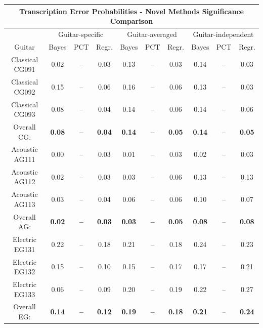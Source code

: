 \documentclass[12pt]{cmuthesis}
\begin{document}
\begin{table}[!htbp]
\begin{center}
\begin{tabular} {||c||c|c|c||c|c|c||c|c|c||}
\hline
\multicolumn{10}{||c||}{\bf{Transcription Error Probabilities - Novel Methods Significance Comparison}} \\
\hline
 & \multicolumn{3}{|c||}{Guitar-specific} & \multicolumn{3}{|c||}{Guitar-averaged}& \multicolumn{3}{|c||}{Guitar-independent}\\
\hline
Guitar & Bayes & PCT & Regr. & Bayes & PCT & Regr. & Bayes & PCT & Regr.\\
\hline
\hline
Classical CG091 & 0.02 & -- & 0.03 & 0.13 & -- & \cellcolor[gray]{0.8}0.03 & 0.14 & -- & \cellcolor[gray]{0.8}0.03 \\
\hline
Classical CG092 & 0.15 & -- & \cellcolor[gray]{0.8}0.06 & 0.16 & -- & \cellcolor[gray]{0.8}0.06 & 0.13 & -- & \cellcolor[gray]{0.8}0.03 \\
\hline
Classical CG093 & 0.08 & -- & \cellcolor[gray]{0.8}0.04 & 0.14 & -- & \cellcolor[gray]{0.8}0.06 & 0.14 & -- & \cellcolor[gray]{0.8}0.06 \\
\hline
Overall CG: & \bf{0.08} & \bf{--}  & \cellcolor[gray]{0.8}\bf{0.04} & \bf{0.14} & \bf{--} & \cellcolor[gray]{0.8}\bf{0.05} & \bf{0.14} & -- & \cellcolor[gray]{0.8}\bf{0.05}\\
\hline
\hline
Acoustic AG111 & \cellcolor[gray]{0.8}0.00 & -- & 0.03 & \cellcolor[gray]{0.8}0.01 & -- & 0.03 & \cellcolor[gray]{0.8}0.02 & -- & 0.03 \\
\hline
Acoustic AG112 & 0.02 & -- & 0.03 & \cellcolor[gray]{0.8}0.03 & -- & 0.06 & 0.13 & -- & 0.13 \\
\hline
Acoustic AG113  & 0.03 & -- & 0.04 & 0.06 & -- & 0.06 & 0.10 & -- & \cellcolor[gray]{0.8}0.07\\
\hline
Overall AG: & \cellcolor[gray]{0.8}\bf{0.02} & \bf{--} & \bf{0.03} & \cellcolor[gray]{0.8}\bf{0.03} & \bf{--} & \bf{0.05} & \bf{0.08} & -- & \bf{0.08}\\
\hline
\hline
Electric EG131 & 0.22 & -- & 0.18 & 0.21 & -- & 0.18 & 0.24 & -- & 0.23\\
\hline
Electric EG132 & 0.15 & -- & \cellcolor[gray]{0.8}0.10 & 0.15 & -- & 0.17 & \cellcolor[gray]{0.8}0.17 & -- & 0.21\\
\hline
Electric EG133 & 0.06 & -- & 0.09 & 0.20 & --  & 0.19 & \cellcolor[gray]{0.8}0.22 & -- & 0.27 \\
\hline
Overall EG: & \bf{0.14} & \bf{--} & \cellcolor[gray]{0.8}\bf{0.12} & \bf{0.19} & \bf{--} & \bf{0.18} & \cellcolor[gray]{0.8}\bf{0.21} & -- & \bf{0.24}\\

\end{tabular}
\end{center}
\end{table}
\end{document}

